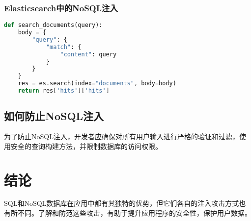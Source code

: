 \documentclass{article}
\begin{document}
\subsubsection{Elasticsearch中的NoSQL注入}
\begin{lstlisting}[language=Python, caption=Elasticsearch中的NoSQL注入]
def search_documents(query):
    body = {
        "query": {
            "match": {
                "content": query
            }
        }
    }
    res = es.search(index="documents", body=body)
    return res['hits']['hits']
\end{lstlisting}

\subsection{如何防止NoSQL注入}
为了防止NoSQL注入，开发者应确保对所有用户输入进行严格的验证和过滤，使用安全的查询构建方法，并限制数据库的访问权限。

\section{结论}
SQL和NoSQL数据库在应用中都有其独特的优势，但它们各自的注入攻击方式也有所不同。了解和防范这些攻击，有助于提升应用程序的安全性，保护用户数据。
\end{document}
